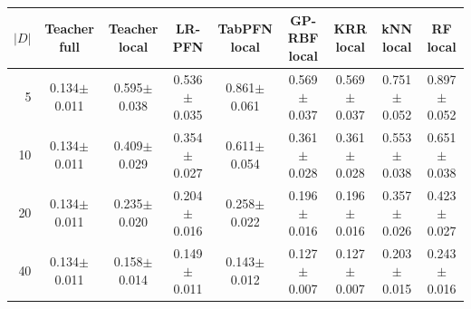 \begin{tabular}{r cccccccc}
\toprule
$|D|$ & Teacher full & Teacher local & LR-PFN & TabPFN local & GP-RBF local & KRR local & kNN local & RF local\\
\midrule
5 & 0.134{\scriptsize$\pm$0.011} & 0.595{\scriptsize$\pm$0.038} & 0.536{\scriptsize$\pm$0.035} & 0.861{\scriptsize$\pm$0.061} & 0.569{\scriptsize$\pm$0.037} & 0.569{\scriptsize$\pm$0.037} & 0.751{\scriptsize$\pm$0.052} & 0.897{\scriptsize$\pm$0.052}\\
10 & 0.134{\scriptsize$\pm$0.011} & 0.409{\scriptsize$\pm$0.029} & 0.354{\scriptsize$\pm$0.027} & 0.611{\scriptsize$\pm$0.054} & 0.361{\scriptsize$\pm$0.028} & 0.361{\scriptsize$\pm$0.028} & 0.553{\scriptsize$\pm$0.038} & 0.651{\scriptsize$\pm$0.038}\\
20 & 0.134{\scriptsize$\pm$0.011} & 0.235{\scriptsize$\pm$0.020} & 0.204{\scriptsize$\pm$0.016} & 0.258{\scriptsize$\pm$0.022} & 0.196{\scriptsize$\pm$0.016} & 0.196{\scriptsize$\pm$0.016} & 0.357{\scriptsize$\pm$0.026} & 0.423{\scriptsize$\pm$0.027}\\
40 & 0.134{\scriptsize$\pm$0.011} & 0.158{\scriptsize$\pm$0.014} & 0.149{\scriptsize$\pm$0.011} & 0.143{\scriptsize$\pm$0.012} & 0.127{\scriptsize$\pm$0.007} & 0.127{\scriptsize$\pm$0.007} & 0.203{\scriptsize$\pm$0.015} & 0.243{\scriptsize$\pm$0.016}\\
\bottomrule
\end{tabular}
